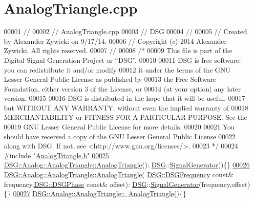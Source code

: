 \hypertarget{_analog_triangle_8cpp_source}{\section{Analog\+Triangle.\+cpp}
\label{_analog_triangle_8cpp_source}
}

\begin{DoxyCode}
00001 \textcolor{comment}{//}
00002 \textcolor{comment}{//  AnalogTriangle.cpp}
00003 \textcolor{comment}{//  DSG}
00004 \textcolor{comment}{//}
00005 \textcolor{comment}{//  Created by Alexander Zywicki on 9/17/14.}
00006 \textcolor{comment}{//  Copyright (c) 2014 Alexander Zywicki. All rights reserved.}
00007 \textcolor{comment}{//}
00008 \textcolor{comment}{/*}
00009 \textcolor{comment}{ This file is part of the Digital Signal Generation Project or “DSG”.}
00010 \textcolor{comment}{}
00011 \textcolor{comment}{ DSG is free software: you can redistribute it and/or modify}
00012 \textcolor{comment}{ it under the terms of the GNU Lesser General Public License as published by}
00013 \textcolor{comment}{ the Free Software Foundation, either version 3 of the License, or}
00014 \textcolor{comment}{ (at your option) any later version.}
00015 \textcolor{comment}{}
00016 \textcolor{comment}{ DSG is distributed in the hope that it will be useful,}
00017 \textcolor{comment}{ but WITHOUT ANY WARRANTY; without even the implied warranty of}
00018 \textcolor{comment}{ MERCHANTABILITY or FITNESS FOR A PARTICULAR PURPOSE.  See the}
00019 \textcolor{comment}{ GNU Lesser General Public License for more details.}
00020 \textcolor{comment}{}
00021 \textcolor{comment}{ You should have received a copy of the GNU Lesser General Public License}
00022 \textcolor{comment}{ along with DSG.  If not, see <http://www.gnu.org/licenses/>.}
00023 \textcolor{comment}{ */}
00024 \textcolor{preprocessor}{#include "\hyperlink{_analog_triangle_8h}{AnalogTriangle.h}"}
\hypertarget{_analog_triangle_8cpp_source_l00025}{}\hyperlink{class_d_s_g_1_1_analog_1_1_analog_triangle_a2fe1a7a29eb9472323a2a1c0d0696e55}{00025} \hyperlink{class_d_s_g_1_1_analog_1_1_analog_triangle_a2fe1a7a29eb9472323a2a1c0d0696e55}{DSG::Analog::AnalogTriangle::AnalogTriangle}():
      \hyperlink{namespace_d_s_g}{DSG}::\hyperlink{class_d_s_g_1_1_signal_generator}{SignalGenerator}()\{\}
\hypertarget{_analog_triangle_8cpp_source_l00026}{}\hyperlink{class_d_s_g_1_1_analog_1_1_analog_triangle_a75c0a8b20e1843b35de3944da11c75ed}{00026} \hyperlink{class_d_s_g_1_1_analog_1_1_analog_triangle_a2fe1a7a29eb9472323a2a1c0d0696e55}{DSG::Analog::AnalogTriangle::AnalogTriangle}(
      \hyperlink{namespace_d_s_g_a4315a061386fa1014fda09b15d3a6973}{DSG::DSGFrequency} \textcolor{keyword}{const}& frequency,\hyperlink{namespace_d_s_g_a44431ce1eb0a7300efdd207bc879e52c}{DSG::DSGPhase} \textcolor{keyword}{const}& offset):
      \hyperlink{namespace_d_s_g}{DSG}::\hyperlink{class_d_s_g_1_1_signal_generator}{SignalGenerator}(frequency,offset)\{\}
\hypertarget{_analog_triangle_8cpp_source_l00027}{}\hyperlink{class_d_s_g_1_1_analog_1_1_analog_triangle_af6e127d2fb623afad9b172e7c8b3c656}{00027} \hyperlink{class_d_s_g_1_1_analog_1_1_analog_triangle_af6e127d2fb623afad9b172e7c8b3c656}{DSG::Analog::AnalogTriangle::~AnalogTriangle}()\{\}
\end{DoxyCode}
